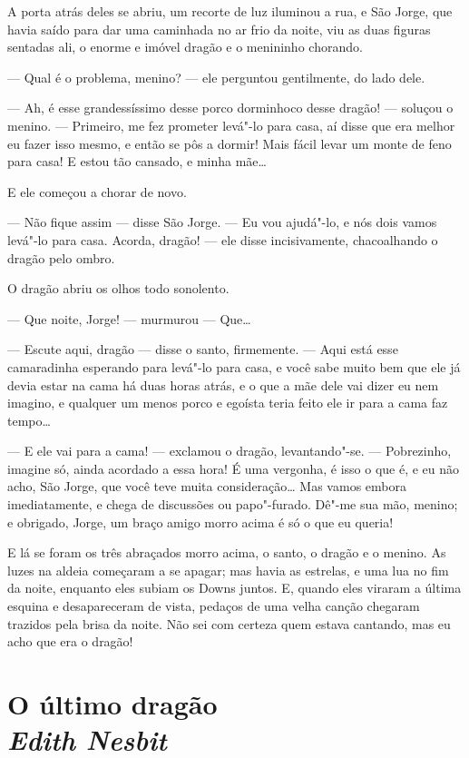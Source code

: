 A porta atrás deles se abriu, um recorte de luz iluminou a rua, e São
Jorge, que havia saído para dar uma caminhada no ar frio da noite,
viu as duas figuras sentadas ali, o enorme e imóvel dragão e o
menininho chorando.

--- Qual é o problema, menino? --- ele perguntou gentilmente, do lado
dele.

--- Ah, é esse grandessíssimo desse porco dorminhoco desse dragão! ---
soluçou o menino. --- Primeiro, me fez prometer levá"-lo para casa, aí
disse que era melhor eu fazer isso mesmo, e então se pôs a dormir!
Mais fácil levar um monte de feno para casa! E estou tão cansado, e
minha mãe\ldots{}

E ele começou a chorar de novo.

--- Não fique assim --- disse São Jorge. --- Eu vou ajudá"-lo, e nós dois
vamos levá"-lo para casa. Acorda, dragão! --- ele disse incisivamente,
chacoalhando o dragão pelo ombro.

O dragão abriu os olhos todo sonolento.

--- Que noite, Jorge! --- murmurou --- Que\ldots{}

--- Escute aqui, dragão --- disse o santo, firmemente. --- Aqui está esse
camaradinha esperando para levá"-lo para casa, e você sabe muito bem
que ele já devia estar na cama há duas horas atrás, e o que a mãe
dele vai dizer eu nem imagino, e qualquer um menos porco e egoísta
teria feito ele ir para a cama faz tempo\ldots{}

--- E ele vai para a cama! --- exclamou o dragão, levantando"-se. ---
Pobrezinho, imagine só, ainda acordado a essa hora! É uma vergonha, é
isso o que é, e eu não acho, São Jorge, que você teve muita
consideração\ldots{} Mas vamos embora imediatamente, e chega de discussões
ou papo"-furado. Dê"-me sua mão, menino; e obrigado, Jorge, um braço
amigo morro acima é só o que eu queria!

E lá se foram os três abraçados morro acima, o santo, o dragão e o
menino. As luzes na aldeia começaram a se apagar; mas havia as
estrelas, e uma lua no fim da noite, enquanto eles subiam os Downs
juntos. E, quando eles viraram a última esquina e desapareceram de
vista, pedaços de uma velha canção chegaram trazidos pela brisa da
noite. Não sei com certeza quem estava cantando, mas eu acho que era
o dragão!

\chapter[O último dragão\\{\itshape Edith Nesbit}]{O último dragão\\{\LARGE\itshape Edith Nesbit}}

